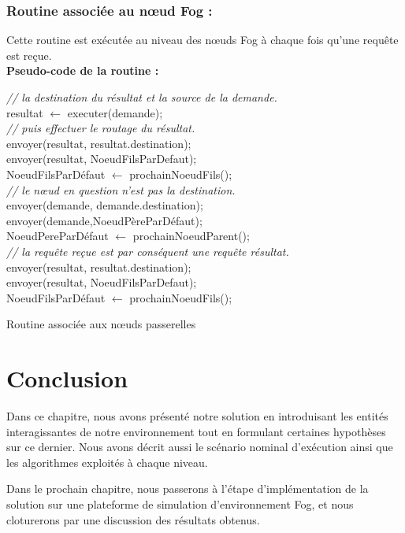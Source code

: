 \subsubsection{Routine associée au nœud Fog :}
Cette routine est exécutée au niveau des nœuds Fog à chaque fois qu'une requête est reçue.\\
\textbf{Pseudo-code de la routine :}\\
\begin{algorithm}[H]
  {  
    { 
      \emph{// la destination du résultat et la source de la demande.}\\
      resultat $\gets$ executer(demande);\\
      \emph{// puis effectuer le routage du résultat.}\\
      {
        envoyer(resultat, resultat.destination);\\
      }
      {
        envoyer(resultat, NoeudFilsParDefaut);\\
        NoeudFilsParDéfaut $\gets$ prochainNoeudFils();\\
      }
    }
    {  
      \emph{// le nœud en question n'est pas la destination.}\\
      {
        envoyer(demande, demande.destination);\\
      }
      {
        envoyer(demande,NoeudPèreParDéfaut);\\
        NoeudPereParDéfaut $\gets$ prochainNoeudParent();\\
      }
    }
  }
  {
    \emph{// la requête reçue est par conséquent une requête résultat.}\\
    {
      envoyer(resultat, resultat.destination);\\
    }
    {
      envoyer(resultat, NoeudFilsParDefaut);\\
      NoeudFilsParDéfaut $\gets$ prochainNoeudFils();\\
    }
  }
  \caption{Routine associée aux nœuds passerelles}
\end{algorithm}



\section{Conclusion}
Dans ce chapitre, nous avons présenté notre solution en introduisant les entités interagissantes de notre environnement tout en formulant certaines hypothèses sur ce dernier. Nous avons décrit aussi le scénario nominal d'exécution ainsi que les algorithmes exploités à chaque niveau.\par
Dans le prochain chapitre, nous passerons à l'étape d'implémentation de la solution sur une plateforme de simulation d'environnement Fog, et nous cloturerons par une discussion des résultats obtenus.
